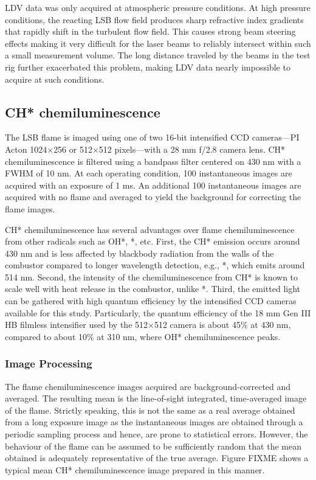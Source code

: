 LDV data was only acquired at atmospheric pressure conditions.
At high pressure conditions, the reacting LSB flow field produces sharp refractive index gradients that rapidly shift in the turbulent flow field.
This causes strong beam steering effects making it very difficult for the laser beams to reliably intersect within such a small measurement volume.
The long distance traveled by the beams in the test rig further exacerbated this problem, making LDV data nearly impossible to acquire at such conditions.

\subsection{CH* chemiluminescence}
\label{sec:chemiluminescence}

The LSB flame is imaged using one of two 16-bit intensified CCD cameras---PI Acton 1024\(\times\)256 or 512\(\times\)512 pixels---with a 28 mm f/2.8 camera lens.
CH* chemiluminescence is filtered using a bandpass filter centered on 430 nm with a FWHM of 10 nm.
At each operating condition, 100 instantaneous images are acquired with an exposure of 1 ms.
An additional 100 instantaneous images are acquired with no flame and averaged to yield the background for correcting the flame images.

CH* chemiluminescence has several advantages over flame chemiluminescence from other radicals such as OH*, *, etc.
First, the CH* emission occurs around 430 nm and is less affected by blackbody radiation from the walls of the combustor compared to longer wavelength detection, e.g., *, which emits around 514 nm.
Second, the intensity of the chemiluminescence from CH* is known to scale well with heat release in the combustor\cite{2006-hardalupas}, unlike *.
Third, the emitted light can be gathered with high quantum efficiency by the intensified CCD cameras available for this study.
Particularly, the quantum efficiency of the 18 mm Gen III HB filmless intensifier used by the 512\(\times\)512 camera is about 45\% at 430 nm, compared to about 10\% at 310 nm, where OH* chemiluminescence peaks.

\subsubsection{Image Processing}

The flame chemiluminescence images acquired are background-corrected and averaged.
The resulting mean is the line-of-sight integrated, time-averaged image of the flame.
Strictly speaking, this is not the same as a real average obtained from a long exposure image as the instantaneous images are obtained through a periodic sampling process and hence, are prone to statistical errors.
However, the behaviour of the flame can be assumed to be sufficiently random that the mean obtained is adequately representative of the true average.
Figure FIXME shows a typical mean CH* chemiluminescence image prepared in this manner.

